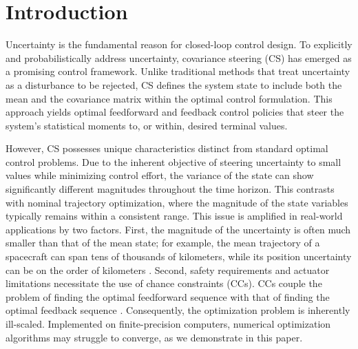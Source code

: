 
\section{Introduction}

Uncertainty is the fundamental reason for closed-loop control design. To explicitly and probabilistically address uncertainty, covariance steering (CS) \cite{hotzCovarianceControlTheory1987,chenOptimalSteeringLinear2016} has emerged as a promising control framework. Unlike traditional methods that treat uncertainty as a disturbance to be rejected, CS defines the system state to include both the mean and the covariance matrix within the optimal control formulation. This approach yields optimal feedforward and feedback control policies that steer the system's statistical moments to, or within, desired terminal values.

However, CS possesses unique characteristics distinct from standard optimal control problems. Due to the inherent objective of steering uncertainty to small values while minimizing control effort, the variance of the state can show significantly different magnitudes throughout the time horizon. This contrasts with nominal trajectory optimization, where the magnitude of the state variables typically remains within a consistent range.
This issue is amplified in real-world applications by two factors. First, the magnitude of the uncertainty is often much smaller than that of the mean state; for example, the mean trajectory of a spacecraft can span tens of thousands of kilometers, while its position uncertainty can be on the order of kilometers \cite{kumagaiRobustCislunarLowThrust2025}. Second, safety requirements and actuator limitations necessitate the use of chance constraints (CCs). CCs couple the problem of finding the optimal feedforward sequence with that of finding the optimal feedback sequence  \cite{okamotoOptimalCovarianceControl2018}. Consequently, the optimization problem is inherently ill-scaled. Implemented on finite-precision computers, numerical optimization algorithms may struggle to converge, as we demonstrate in this paper.

